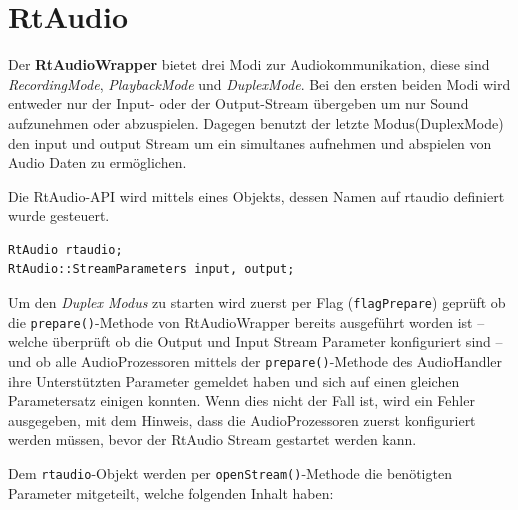 \section{RtAudio}

Der \textbf{RtAudioWrapper} bietet drei Modi zur Audiokommunikation, diese sind \textit{RecordingMode}, \textit{PlaybackMode} und \textit{DuplexMode}. Bei den ersten beiden Modi wird entweder nur der Input- oder der Output-Stream übergeben um nur Sound aufzunehmen oder abzuspielen. Dagegen benutzt der letzte Modus(DuplexMode) den input und output Stream um ein simultanes aufnehmen und abspielen von Audio Daten zu ermöglichen.

Die RtAudio-API wird mittels eines Objekts, dessen Namen auf rtaudio definiert wurde gesteuert.

\begin{lstlisting}[caption={RtAudio Objekt und StreamParameter},label={Code:RtAudio Objekt}]
RtAudio rtaudio;
RtAudio::StreamParameters input, output;
\end{lstlisting}

Um den \textit{Duplex Modus} zu starten wird zuerst per Flag (\texttt{flagPrepare}) geprüft ob die \texttt{prepare()}-Methode von RtAudioWrapper bereits ausgeführt worden ist -- welche überprüft ob die Output und Input Stream Parameter konfiguriert sind -- und ob alle AudioProzessoren mittels der \texttt{prepare()}-Methode des AudioHandler ihre Unterstützten Parameter gemeldet haben und sich auf einen gleichen Parametersatz einigen konnten. Wenn dies nicht der Fall ist, wird ein Fehler ausgegeben, mit dem Hinweis, dass die AudioProzessoren zuerst konfiguriert werden müssen, bevor der RtAudio Stream gestartet werden kann.

Dem \texttt{rtaudio}-Objekt werden per \texttt{openStream()}-Methode die benötigten Parameter mitgeteilt, welche folgenden Inhalt haben:

